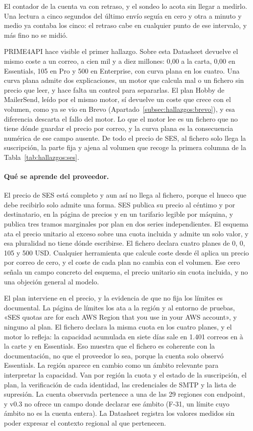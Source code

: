 El contador de la cuenta va con retraso, y el sondeo lo acota sin llegar a
medirlo. Una lectura a cinco segundos del último envío seguía en cero y otra
a minuto y medio ya contaba los cinco: el retraso cabe en cualquier punto de
ese intervalo, y más fino no se midió.

PRIME4API hace visible el primer hallazgo. Sobre esta Datasheet devuelve el mismo coste a un correo, a cien mil y a diez
millones: 0,00 a la carta, 0,00 en Essentials, 105 en Pro y 500 en
Enterprise, con curva plana en los cuatro. Una curva plana admite dos
explicaciones, un motor que calcula mal o un fichero sin precio que leer, y
hace falta un control para separarlas. El plan Hobby de MailerSend, leído por
el mismo motor, sí devuelve un coste que crece con el volumen, como ya se vio
en Brevo (Apartado~\ref{subsec:hallazgos:brevo}), y esa diferencia descarta el
fallo del motor. Lo que el motor lee es un fichero
que no tiene dónde guardar el precio por correo, y la curva plana es la
consecuencia numérica de ese campo ausente. De todo el precio de SES, al
fichero solo llega la suscripción, la parte fija y ajena al volumen que
recoge la primera columna de la Tabla~\ref{tab:hallazgos:ses}.

\paragraph{Qué se aprende del proveedor.} El precio de SES está completo y aun
así no llega al fichero, porque el hueco que debe recibirlo solo admite una
forma. SES publica su precio al céntimo y por destinatario, en la página de
precios y en un tarifario legible por máquina, y publica tres tramos
marginales por plan en dos series independientes. El esquema ata el precio
unitario al exceso sobre una cuota incluida y admite un solo valor, y esa
pluralidad no tiene dónde escribirse. El fichero declara cuatro planes de 0,
0, 105 y 500 USD. Cualquier herramienta que calcule coste desde él
aplica un precio por correo de cero, y el coste de cada plan no cambia con el volumen. Ese cero señala un campo concreto
del esquema, el precio unitario sin cuota incluida, y no una objeción general
al modelo.

El plan interviene en el precio, y la evidencia de que no fija los límites es
documental. La página de límites los ata a la región y al entorno de pruebas,
«SES quotas are for each AWS Region that you use in your AWS account», y
ninguno al plan. El fichero declara la misma cuota en los cuatro planes, y el
motor lo refleja: la capacidad acumulada en siete días sale en 1.401 correos
en à la carte y en Essentials. Eso muestra que el fichero es coherente con la
documentación, no que el proveedor lo sea, porque la cuenta solo observó
Essentials. La región aparece en
cambio como un ámbito relevante para interpretar la capacidad. Van por región
la cuota y el estado de la suscripción, el plan, la verificación de cada identidad,
las credenciales de SMTP y la lista de supresión. La cuenta observada
pertenece a una de las 29 regiones con endpoint, y v0.3 no ofrece un
campo donde declarar ese ámbito (F-31, un límite cuyo ámbito no es la cuenta
entera). La Datasheet registra los valores medidos sin
poder expresar el contexto regional al que pertenecen.

